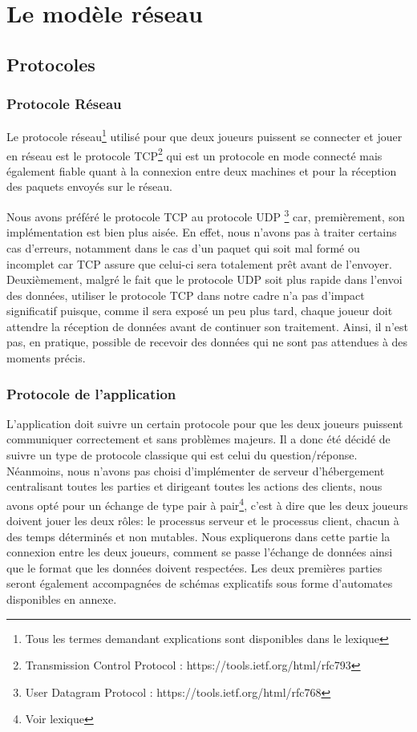 \section{Le modèle réseau}

\subsection{Protocoles}
	\subsubsection{Protocole Réseau}
	Le protocole réseau\footnote{Tous les termes demandant explications sont disponibles dans le lexique} utilisé pour que deux joueurs puissent se connecter et jouer en réseau est le protocole TCP\footnote{Transmission Control Protocol : https://tools.ietf.org/html/rfc793} qui est un protocole en mode connecté mais également fiable quant à la connexion entre deux machines et pour la réception des paquets envoyés sur le réseau. \newline
	
	Nous avons préféré le protocole TCP au protocole UDP \footnote{User Datagram Protocol : https://tools.ietf.org/html/rfc768} car, premièrement, son implémentation est bien plus aisée. En effet, nous n'avons pas à traiter certains cas d'erreurs, notamment dans le cas d'un paquet qui soit mal formé ou incomplet car TCP assure que celui-ci sera totalement prêt avant de l'envoyer. \newline
	Deuxièmement, malgré le fait que le protocole UDP soit plus rapide dans l'envoi des données, utiliser le protocole TCP dans notre cadre n'a pas d'impact significatif puisque, comme il sera exposé un peu plus tard, chaque joueur doit attendre la réception de données avant de continuer son traitement. Ainsi, il n'est pas, en pratique, possible de recevoir des données qui ne sont pas attendues à des moments précis.

	\subsubsection{Protocole de l'application}
		L'application doit suivre un certain protocole pour que les deux joueurs puissent communiquer correctement et sans problèmes majeurs. Il a donc été décidé de suivre un type de protocole classique qui est celui du question/réponse. Néanmoins, nous n'avons pas choisi d'implémenter de serveur d'hébergement centralisant toutes les parties et dirigeant toutes les actions des clients, nous avons opté pour un échange de type pair à pair\footnote{Voir lexique}, c'est à dire que les deux joueurs doivent jouer les deux rôles: le processus serveur et le processus client, chacun à des temps déterminés et non mutables. \newline
		Nous expliquerons dans cette partie la connexion entre les deux joueurs, comment se passe l'échange de données ainsi que le format que les données doivent respectées. Les deux premières parties seront également accompagnées de schémas explicatifs sous forme d'automates disponibles en annexe.
		
